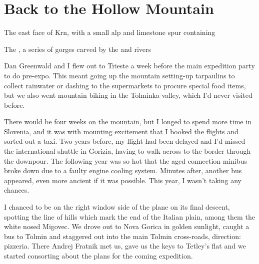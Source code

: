 \section{Back to the Hollow Mountain}
     \begin{marginfigure}
        \centering
        \caption{The east face of Krn, with a small alp and limestone spur containing \protect{} } \label{Krn}
    \end{marginfigure}
   \vspace{30pt}
    \begin{marginfigure}
        \centering
        \caption{ The \protect{}, a series of gorges carved by the \protect{} and \protect{} rivers } \label{Tolminka Gorge}
    \end{marginfigure}
Dan Greenwald and I flew out to Trieste a week before the main expedition party to do pre-expo. This meant going up the mountain setting-up tarpaulins to collect rainwater or dashing to the supermarkets to procure special food items, but we also went mountain biking in the Tolminka valley, which I'd never visited before.

 There would be four weeks on the mountain, but I longed to spend more time in Slovenia, and it was with mounting excitement that I booked the flights and sorted out a taxi. Two years before, my flight had been delayed and I'd missed the international shuttle in Gorizia, having to walk across to the border through the downpour. The following year was so hot that the aged connection minibus broke down due to a faulty engine cooling system. Minutes after, another bus appeared, even more ancient if it was possible. This year, I wasn't taking any chances.

I chanced to be on the right window side of the plane on its final descent, spotting the line of hills which mark the end of the Italian plain, among them the white nosed Migovec. We drove out to Nova Gorica in golden sunlight, caught a bus to Tolmin and staggered out into the main Tolmin cross-roads, direction: pizzeria. There Andrej Fratnik met us, gave us the keys to Tetley's flat and we started consorting about the plans for the coming expedition. 


